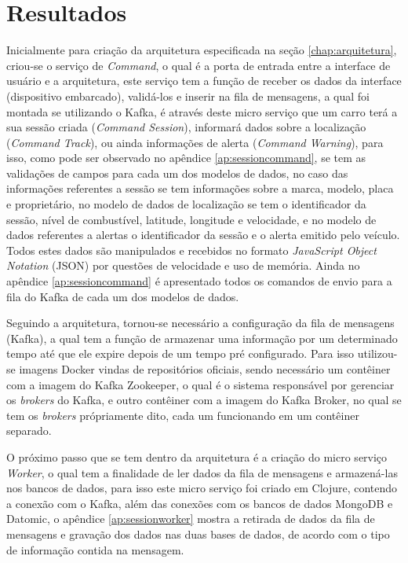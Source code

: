 \chapter{Resultados}
\label{chap:analiseresultados}
Inicialmente para criação da arquitetura especificada na seção \ref{chap:arquitetura}, criou-se o serviço de \textit{Command}, o qual é a porta de entrada entre a interface de usuário e a arquitetura, este serviço tem a função de receber os dados da interface (dispositivo embarcado), validá-los e inserir na fila de mensagens, a qual foi montada se utilizando o Kafka, é através deste micro serviço que um carro terá a sua sessão criada (\textit{Command Session}), informará dados sobre a localização (\textit{Command Track}), ou ainda informações de alerta (\textit{Command Warning}), para isso, como pode ser observado no apêndice \ref{ap:sessioncommand}, se tem as validações de campos para cada um dos modelos de dados, no caso das informações referentes a sessão se tem informações sobre a marca, modelo, placa e  proprietário, no modelo de dados de localização se tem o identificador da sessão, nível de combustível, latitude, longitude e velocidade, e no modelo de dados referentes a alertas o identificador da sessão e o alerta emitido pelo veículo. Todos estes dados são manipulados e recebidos no formato \textit{JavaScript Object Notation} (JSON) por questões de velocidade e uso de memória. Ainda no apêndice  \ref{ap:sessioncommand} é apresentado todos os comandos de envio para a fila do Kafka de cada um dos modelos de dados.

Seguindo a arquitetura, tornou-se necessário a configuração da fila de mensagens (Kafka), a qual tem a função de armazenar uma informação por um determinado tempo até que ele expire depois de um tempo pré configurado. Para isso utilizou-se imagens Docker vindas de repositórios oficiais, sendo necessário um contêiner com a imagem do Kafka Zookeeper, o qual é o sistema responsável por gerenciar os \textit{brokers} do Kafka, e outro contêiner com a imagem do Kafka Broker, no qual se tem os \textit{brokers} própriamente dito, cada um funcionando em um contêiner separado.

O próximo passo que se tem dentro da arquitetura é a criação do micro serviço \textit{Worker}, o qual tem a finalidade de ler dados da fila de mensagens e armazená-las nos bancos de dados, para isso este micro serviço foi criado em Clojure, contendo a conexão com o Kafka, além das conexões com os bancos de dados MongoDB e Datomic, o apêndice \ref{ap:sessionworker} mostra a retirada de dados da fila de mensagens e gravação dos dados nas duas bases de dados, de acordo com o tipo de informação contida na mensagem.

